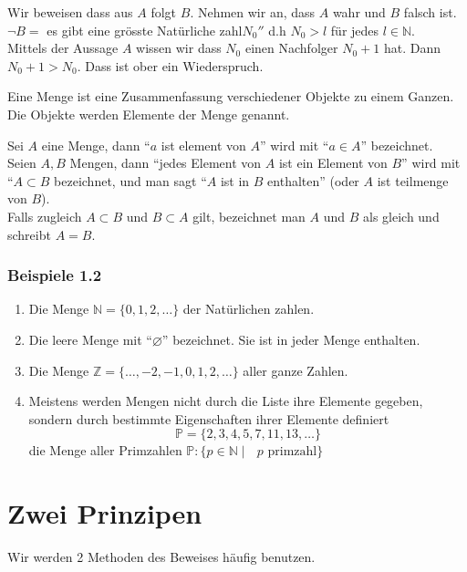 \noindent Wir beweisen dass aus $A$ folgt $B$. Nehmen wir an, dass $A$ wahr und $B$ falsch ist. \\

\noindent $\lnot B=$ es gibt eine grösste Natürliche zahl$N_0''$ d.h $N_0>l$ für jedes $l \in \mathbb{N}$.\\

Mittels der Aussage $A$ wissen wir dass $N_0$ einen Nachfolger $N_0 +1$ hat. Dann $N_0+1>N_0$. Dass ist ober ein Wiederspruch.

\begin{definition}{1.1}
Eine Menge ist eine Zusammenfassung verschiedener Objekte zu einem Ganzen.\\
Die Objekte werden Elemente der Menge genannt. 
\end{definition}

Sei $A$ eine Menge, dann ``$a$ ist element von $A$'' wird mit ``$a\in A$'' bezeichnet.\\
Seien $A,B$ Mengen, dann ``jedes Element von $A$ ist ein Element von $B$'' wird mit ``$A\subset B$ bezeichnet, und man sagt ``$A$ ist in $B$ enthalten'' (oder $A$ ist teilmenge von $B$). \\

Falls zugleich $A\subset B$ und $B\subset A$ gilt, bezeichnet man $A$ und $B$ als gleich und schreibt $A=B$. 

\subsubsection*{Beispiele 1.2}
\begin{enumerate}
	\item Die Menge $\mathbb{N}=\{0,1,2,\dots\}$ der Natürlichen zahlen.
	\item Die leere Menge mit ``$\varnothing$'' bezeichnet. Sie ist in jeder Menge enthalten.
	\item Die Menge $\mathbb{Z}=\{\dots,-2,-1,0,1,2,\dots\}$ aller ganze Zahlen.
	\item Meistens werden Mengen nicht durch die Liste ihre Elemente gegeben, sondern durch bestimmte Eigenschaften ihrer Elemente definiert \[\mathbb{P}=\{2,3,4,5,7,11,13,\dots\}\] die Menge aller Primzahlen $\mathbb{P}:\{p\in\mathbb{N}\mid\text{ $p$ primzahl}\}$
\end{enumerate}
\section{Zwei Prinzipen}
Wir werden 2 Methoden des Beweises häufig benutzen.

